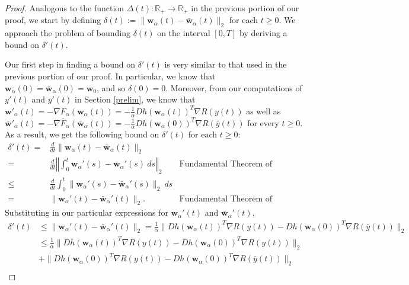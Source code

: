 \documentclass{article}
\begin{document}
\begin{proof}
Analogous to the function $\Delta(t): \mathbb{R}_+ \rightarrow 
\mathbb{R}_+$ in the previous portion of our proof, we start by defining $\delta(t) := \| \boldsymbol{w}_{\alpha}(t) - \boldsymbol{\bar{w}}_{\alpha}(t) \|_2$ for each $t \geq 0$. We approach the problem of bounding $\delta(t)$ on the interval $[0, T]$ by deriving a bound on $\delta'(t)$. 

Our first step in finding a bound on $\delta'(t)$ is very similar to that used in the previous portion of our proof. In particular, we know that $\boldsymbol{w}_{\alpha}(0) = \boldsymbol{\bar{w}}_{\alpha}(0) = \boldsymbol{w}_0$, and so $\delta(0) = 0$. Moreover, from our computations of $y'(t)$ and $\bar{y}'(t)$ in Section \ref{prelim}, we know that $\boldsymbol{w}'_{\alpha}(t) = - \nabla F_{\alpha}(\boldsymbol{w}_{\alpha}(t)) = - \frac{1}{\alpha} Dh(\boldsymbol{w}_{\alpha}(t))^T \nabla R(y(t))$ as well as $\boldsymbol{\bar{w}}'_{\alpha}(t) = - \nabla \bar{F}_{\alpha}(\boldsymbol{\bar{w}}_{\alpha}(t)) = -\frac{1}{\alpha} Dh(\boldsymbol{w}_{\alpha}(0))^T \nabla R(\bar{y}(t))$ for every $t \geq 0$. As a result, we get the following bound on $\delta'(t)$ for each $t \geq 0$:
\begin{align*}
    \delta'(t) =& \frac{d}{dt} \| \boldsymbol{w}_{\alpha}(t) - \boldsymbol{\bar{w}}_{\alpha}(t) \|_2\\
    =& \frac{d}{dt} \left\Vert \int_0^t \boldsymbol{w}_{\alpha}'(s) - \boldsymbol{\bar{w}}_{\alpha}'(s) \ ds \right\Vert_2  & \text{Fundamental Theorem of Calculus}\\
    \leq& \frac{d}{dt} \int_0^t \| \boldsymbol{w}_{\alpha}'(s) - \boldsymbol{\bar{w}}_{\alpha}'(s) \|_2 \ ds\\
    =& \| \boldsymbol{w}_{\alpha}'(t) - \boldsymbol{\bar{w}}_{\alpha}'(t) \|_2. & \text{Fundamental Theorem of Calculus}
\end{align*}
Substituting in our particular expressions for $\boldsymbol{w}_{\alpha}'(t)$ and $\boldsymbol{\bar{w}}_{\alpha}'(t)$, 
\begin{align*}
    \delta'(t) &\leq \| \boldsymbol{w}_{\alpha}'(t) - \boldsymbol{\bar{w}}_{\alpha}'(t) \|_2 = \frac{1}{\alpha}\|Dh(\boldsymbol{w}_{\alpha}(t))^T \nabla R(y(t)) - Dh(\boldsymbol{w}_{\alpha}(0))^T \nabla R(\bar{y}(t)) \|_2\\
    &\leq \frac{1}{\alpha}\|Dh(\boldsymbol{w}_{\alpha}(t))^T \nabla R(y(t)) -  Dh(\boldsymbol{w}_{\alpha}(0))^T \nabla R(y(t)) \|_2\\
    &+ \|Dh(\boldsymbol{w}_{\alpha}(0))^T \nabla R(y(t)) - Dh(\boldsymbol{w}_{\alpha}(0))^T \nabla R(\bar{y}(t)) \|_2\\

\end{align*}
\end{proof}
\end{document}

